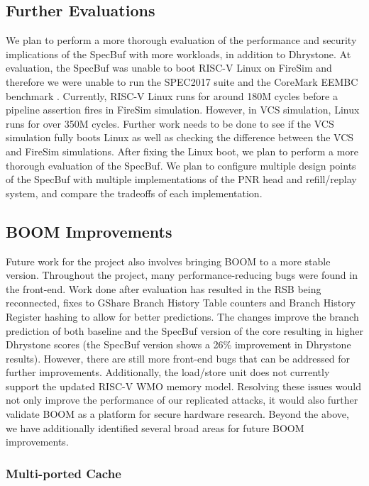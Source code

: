 \subsection{Further Evaluations}

We plan to perform a more thorough evaluation of the performance and security implications of the
SpecBuf with more workloads, in addition to Dhrystone. At evaluation, the SpecBuf was unable to boot
RISC-V Linux on FireSim and therefore we were unable to run the SPEC2017 suite and the CoreMark EEMBC benchmark \cite{b50, b51}.
Currently, RISC-V Linux runs for around 180M cycles before a pipeline assertion fires in FireSim simulation. However, 
in VCS simulation, Linux runs for over 350M cycles. Further work needs to be done to see if the VCS simulation
fully boots Linux as well as checking the difference between the VCS and FireSim simulations. After fixing the Linux boot, we
plan to perform a more thorough evaluation of the SpecBuf. We plan to configure multiple design
points of the SpecBuf with multiple implementations of the PNR head and refill/replay system,
and compare the tradeoffs of each implementation.

\subsection{BOOM Improvements}

Future work for the project also involves bringing BOOM to a more stable version. Throughout
the project, many performance-reducing bugs were found in the front-end. Work done after
evaluation has resulted in the RSB being reconnected, fixes to GShare Branch History
Table counters and Branch History Register hashing to allow for better predictions.
The changes improve the branch prediction of both baseline and the SpecBuf version of the core resulting in
higher Dhrystone scores (the SpecBuf version shows a 26\% improvement in Dhrystone results). 
However, there are still more front-end bugs that can be addressed for further improvements.
Additionally, the load/store unit does not currently support the updated RISC-V WMO memory model.
Resolving these issues would not only improve the performance of our replicated attacks,
it would also further validate BOOM as a platform for secure hardware research.
Beyond the above, we have additionally identified several broad areas for future BOOM improvements.

\subsubsection{Multi-ported Cache}

